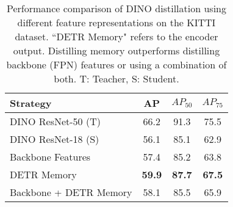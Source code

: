 \begin{table}[t]
\centering
    \begin{tabular}{l|ccc}
        \toprule
        Strategy &  AP & $AP_{50}$ & $AP_{75}$ \\
        \midrule
        DINO ResNet-50 (T) & 66.2 & 91.3 & 75.5 \\
        DINO ResNet-18 (S) & 56.1 & 85.1 & 62.9 \\
        Backbone Features  & 57.4 & 85.2   & 63.8 \\
        DETR Memory & \textbf{59.9} & \textbf{87.7} & \textbf{67.5}  \\
        Backbone + DETR Memory & 58.1 & 85.5 & 65.9 \\
        \bottomrule
    \end{tabular}
    \caption{Performance comparison of DINO distillation using different feature representations on the KITTI dataset. ``DETR Memory" refers to the encoder output. Distilling memory outperforms distilling backbone (FPN) features or using a combination of both. T: Teacher, S: Student.}
    \label{tab:Preliminary}
\end{table}
